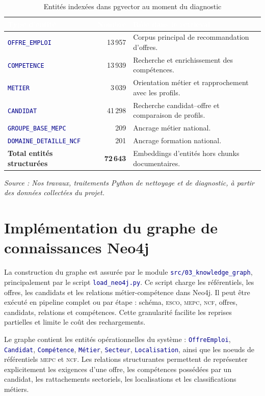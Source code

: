 \documentclass[12pt,twoside]{report}
\newcommand{\source}[1]{%
  \par\vspace{0.2\baselineskip}
  {\centering\footnotesize\itshape Source : #1\par}
}
\newcommand{\filevar}[1]{\texttt{\textcolor{darkblue}{#1}}}
\newcommand{\tabheader}[1]{\textcolor{white}{\textbf{#1}}}
\newcommand{\tableStyleStart}{%
  \small
  \renewcommand{\arraystretch}{1.12}%
  \setlength{\tabcolsep}{4pt}%
  \rowcolors{2}{lightblue!12}{white}%
}
\newcommand{\tableStyleEnd}{%
  \rowcolors{2}{}{}%
  \renewcommand{\arraystretch}{1}%
}
\newcommand{\ESCO}{\textsc{esco}}
\newcommand{\MEPC}{\textsc{mepc}}
\newcommand{\NCF}{\textsc{ncf}}
\begin{document}
\begin{table}[H]
  \centering
  \caption{Entités indexées dans pgvector au moment du diagnostic}
  \label{tab:pgvector_diagnostic_chap3}
  \tableStyleStart
  \begin{tabularx}{0.82\textwidth}{p{5.0cm}rX}
    \rowcolor{darkblue}
    \tabheader{Type d'entité} & \tabheader{Nombre} & \tabheader{Rôle dans le retrieval} \\
    \midrule
    \filevar{OFFRE\_EMPLOI} & 13\,957 & Corpus principal de recommandation d'offres. \\
    \filevar{COMPETENCE} & 13\,939 & Recherche et enrichissement des compétences. \\
    \filevar{METIER} & 3\,039 & Orientation métier et rapprochement avec les profils. \\
    \filevar{CANDIDAT} & 41\,298 & Recherche candidat--offre et comparaison de profils. \\
    \filevar{GROUPE\_BASE\_MEPC} & 209 & Ancrage métier national. \\
    \filevar{DOMAINE\_DETAILLE\_NCF} & 201 & Ancrage formation national. \\
    \midrule
    \textbf{Total entités structurées} & \textbf{72\,643} & Embeddings d'entités hors chunks documentaires. \\
    \bottomrule
  \end{tabularx}
  \tableStyleEnd
  \source{Nos travaux, traitements Python de nettoyage et de diagnostic, à partir des données collectées du projet.}
\end{table}

\section{Implémentation du graphe de connaissances Neo4j}

La construction du graphe est assurée par le module \filevar{src/03\_knowledge\_graph}, principalement par le script \filevar{load\_neo4j.py}. Ce script charge les référentiels, les offres, les candidats et les relations métier-compétence dans Neo4j. Il peut être exécuté en pipeline complet ou par étape : schéma, \ESCO{}, \MEPC{}, \NCF{}, offres, candidats, relations et compétences. Cette granularité facilite les reprises partielles et limite le coût des rechargements.

Le graphe contient les entités opérationnelles du système : \filevar{OffreEmploi}, \filevar{Candidat}, \filevar{Compétence}, \filevar{Métier}, \filevar{Secteur}, \filevar{Localisation}, ainsi que les noeuds de référentiels \MEPC{} et \NCF{}. Les relations structurantes permettent de représenter explicitement les exigences d'une offre, les compétences possédées par un candidat, les rattachements sectoriels, les localisations et les classifications métiers.
\end{document}
